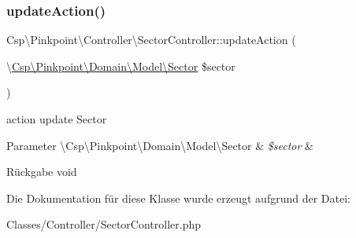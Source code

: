 \subsubsection{\texorpdfstring{update\+Action()}{updateAction()}}
{\footnotesize\ttfamily Csp\textbackslash{}\+Pinkpoint\textbackslash{}\+Controller\textbackslash{}\+Sector\+Controller\+::update\+Action (\begin{DoxyParamCaption}\item[{\textbackslash{}\hyperlink{classCsp_1_1Pinkpoint_1_1Domain_1_1Model_1_1Sector}{Csp\textbackslash{}\+Pinkpoint\textbackslash{}\+Domain\textbackslash{}\+Model\textbackslash{}\+Sector}}]{\$sector }\end{DoxyParamCaption})}

action update Sector


\begin{DoxyParams}[1]{Parameter}
\textbackslash{}\+Csp\textbackslash{}\+Pinkpoint\textbackslash{}\+Domain\textbackslash{}\+Model\textbackslash{}\+Sector & {\em \$sector} & \\
\hline
\end{DoxyParams}
\begin{DoxyReturn}{Rückgabe}
void 
\end{DoxyReturn}


Die Dokumentation für diese Klasse wurde erzeugt aufgrund der Datei\+:\begin{DoxyCompactItemize}
\item 
Classes/\+Controller/Sector\+Controller.\+php\end{DoxyCompactItemize}
